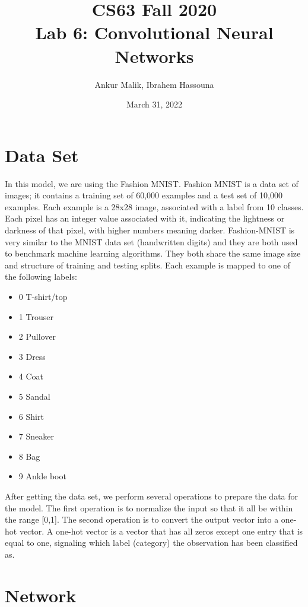 \documentclass[11pt]{article}
\title{CS63 Fall 2020\\Lab 6: Convolutional Neural Networks}
\author{Ankur Malik, Ibrahem Hassouna}
\date{March 31, 2022}
\begin{document}
\begin{center}

\maketitle

\section{Data Set}

In this model, we are using the Fashion MNIST. Fashion MNIST is a data set of images; it contains a training set of 60,000 examples and a test set of 10,000 examples.
Each example is a 28x28 image, associated with a label from 10 classes.
Each pixel has an integer value associated with it, indicating the lightness or darkness of that pixel, with higher numbers meaning darker.
Fashion-MNIST is very similar to the MNIST data set (handwritten digits) and they are both used to benchmark machine learning algorithms.
They both share the same image size and structure of training and testing splits.
\linebreak
Each example is mapped to one of the following labels:
\begin{itemize}
  \item 0 T-shirt/top
  \item 1 Trouser
  \item 2 Pullover
  \item 3 Dress
  \item 4 Coat
  \item 5 Sandal
  \item 6 Shirt
  \item 7 Sneaker
  \item 8 Bag
  \item 9 Ankle boot
\end{itemize}
\linebreak
After getting the data set, we perform several operations to prepare the data for the model. The first operation is to normalize the input so that it all be within the range [0,1].
The second operation is to convert the output vector into a one-hot vector. A one-hot vector is a vector that has all zeros except one entry that is equal to one,
signaling which label (category) the observation has been classified as.

\section{Network}


\end{center}
\end{document}
